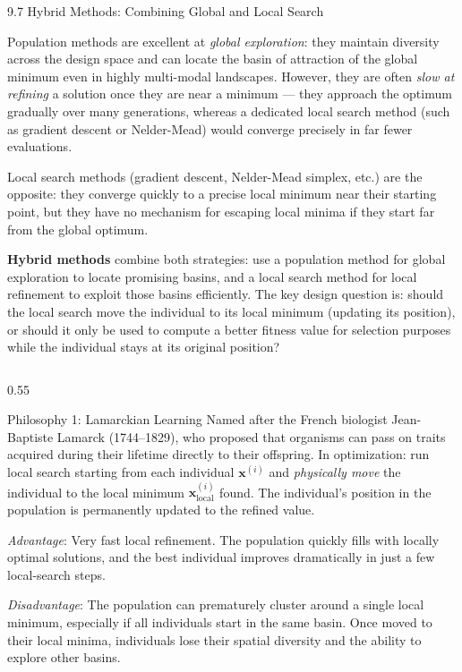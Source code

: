 \documentclass[aspectratio=169,10pt]{beamer}
\newcommand{\bx}{\mathbf{x}}
\begin{document}
\begin{frame}[allowframebreaks]{9.7 Hybrid Methods: Combining Global and Local Search}

  Population methods are excellent at \emph{global exploration}: they
  maintain diversity across the design space and can locate the basin
  of attraction of the global minimum even in highly multi-modal
  landscapes.  However, they are often \emph{slow at refining} a
  solution once they are near a minimum --- they approach the optimum
  gradually over many generations, whereas a dedicated local search
  method (such as gradient descent or Nelder-Mead) would converge
  precisely in far fewer evaluations.

  Local search methods (gradient descent, Nelder-Mead simplex, etc.)
  are the opposite: they converge quickly to a precise local minimum
  near their starting point, but they have no mechanism for escaping
  local minima if they start far from the global optimum.

  \textbf{Hybrid methods} combine both strategies: use a population
  method for global exploration to locate promising basins, and
  a local search method for local refinement to exploit those basins
  efficiently.  The key design question is: should the local search
  move the individual to its local minimum (updating its position),
  or should it only be used to compute a better fitness value for
  selection purposes while the individual stays at its original
  position?

  \begin{columns}[T]
    \begin{column}{0.55\textwidth}
      \begin{block}{Philosophy 1: Lamarckian Learning}
        Named after the French biologist Jean-Baptiste Lamarck (1744--1829),
        who proposed that organisms can pass on traits acquired during
        their lifetime directly to their offspring.  In optimization:
        run local search starting from each individual $\bx^{(i)}$
        and \emph{physically move} the individual to the local minimum
        $\bx^{(i)}_{\text{local}}$ found.  The individual's position
        in the population is permanently updated to the refined value.

        \textit{Advantage}: Very fast local refinement.  The population
        quickly fills with locally optimal solutions, and the best
        individual improves dramatically in just a few local-search
        steps.

        \textit{Disadvantage}: The population can prematurely cluster
        around a single local minimum, especially if all individuals
        start in the same basin.  Once moved to their local minima,
        individuals lose their spatial diversity and the ability to
        explore other basins.
      \end{block}


\end{column}
\end{columns}
\end{frame}
\end{document}
